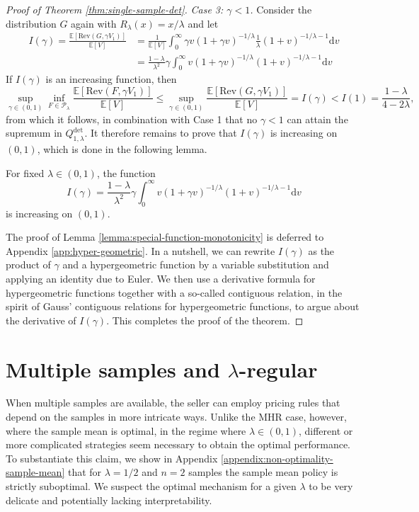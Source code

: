 \documentclass[11pt]{article}
\newcommand{\E}{\mathbb{E}}
\newcommand{\dd}{\mathrm{d}}
\begin{document}
\begin{proof}[Proof of Theorem \ref{thm:single-sample-det}]
    \textit{Case 3: $\gamma < 1$.} 
    Consider the distribution $G$ again with $R_\lambda(x)=x/\lambda$ and let
        \begin{align*}
        I(\gamma)= \frac{\E[\mathrm{Rev}(G, \gamma V_1)]}{\E[V]} &=\frac{1}{\E[V]}\int_0^\infty \gamma v(1+\gamma v)^{-1/\lambda}\frac{1}{\lambda}(1+v)^{-1/\lambda-1}\dd v\\
        &=\frac{1-\lambda}{\lambda^2}\gamma\int_0^\infty v(1+\gamma v)^{-1/\lambda}(1+v)^{-1/\lambda-1}\dd v
    \end{align*}
    If $I(\gamma)$ is an increasing function, then 
    \begin{equation*}
        \sup_{\gamma \in(0,1)}\inf_{F\in\mathcal{P}_{\lambda}}\frac{\E[\mathrm{Rev}(F, \gamma V_1)]}{\E[V]}\le \sup_{\gamma \in(0,1)}\frac{\E[\mathrm{Rev}(G, \gamma V_1)]}{\E[V]}=I(\gamma)<I(1)=\frac{1-\lambda}{4-2\lambda},
    \end{equation*}
    from which it follows, in combination with Case 1 that no $\gamma < 1$ can attain the supremum in $Q_{1,\lambda}^\mathrm{det}$. It therefore remains to prove  that $I(\gamma)$ is increasing on $(0,1)$, which is done in the following lemma.  
    \begin{lemma}
    \label{lemma:special-function-monotonicity}
    For fixed $\lambda\in(0,1)$, the function 
    $$
    I(\gamma) = \frac{1-\lambda}{\lambda^2}\gamma\int_0^\infty v(1+\gamma v)^{-1/\lambda}(1+v)^{-1/\lambda-1}\dd v
    $$ is increasing on $(0,1)$.
\end{lemma}
The proof of Lemma \ref{lemma:special-function-monotonicity} is deferred to Appendix \ref{app:hyper-geometric}. In a nutshell, we can rewrite $I(\gamma)$ as the product of $\gamma$ and a hypergeometric function by a variable substitution and applying an identity due to Euler. We then use a derivative formula for hypergeometric functions together with a so-called contiguous relation, in the spirit of Gauss' contiguous relations for hypergeometric functions, to argue about the derivative of $I(\gamma)$.
This completes the proof of the theorem.
\end{proof}

\section{Multiple samples and \texorpdfstring{$\lambda$}{lambda}-regular}
\label{sec:lambda-multiple}
When multiple samples are available, the seller can employ pricing rules that depend on the samples in more intricate ways.
Unlike the MHR case, however, where the sample mean is optimal, in the regime where $\lambda \in (0,1)$, different or more complicated strategies seem necessary to obtain the optimal performance. To substantiate this claim, we show in Appendix \ref{appendix:non-optimality-sample-mean} that for $\lambda=1/2$ and $n=2$ samples the sample mean policy is strictly suboptimal. We suspect the optimal mechanism for a given $\lambda$ to be very delicate and potentially lacking interpretability.
\end{document}
